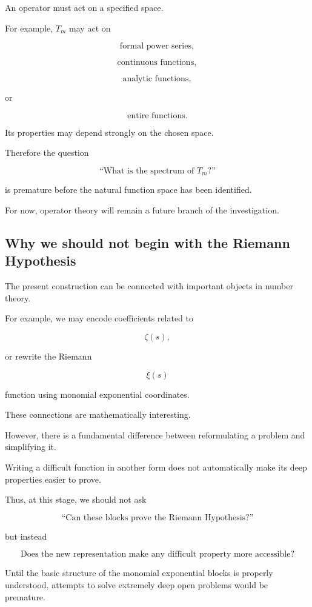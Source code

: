 An operator must act on a specified space.

For example, \(T_m\) may act on

\[
\text{formal power series},
\]

\[
\text{continuous functions},
\]

\[
\text{analytic functions},
\]

or

\[
\text{entire functions}.
\]

Its properties may depend strongly on the chosen space.

Therefore the question

\[
\text{``What is the spectrum of }T_m\text{?''}
\]

is premature before the natural function space has been identified.

For now, operator theory will remain a future branch of the investigation.

\subsection{Why we should not begin with the Riemann Hypothesis}

The present construction can be connected with important objects in number
theory.

For example, we may encode coefficients related to

\[
\zeta(s),
\]

or rewrite the Riemann

\[
\xi(s)
\]

function using monomial exponential coordinates.

These connections are mathematically interesting.

However, there is a fundamental difference between reformulating a problem
and simplifying it.

Writing a difficult function in another form does not automatically make its
deep properties easier to prove.

Thus, at this stage, we should not ask

\[
\text{``Can these blocks prove the Riemann Hypothesis?''}
\]

but instead

\[
\boxed{
\text{Does the new representation make any difficult property more
accessible?}
}
\]

Until the basic structure of the monomial exponential blocks is properly
understood, attempts to solve extremely deep open problems would be
premature.

